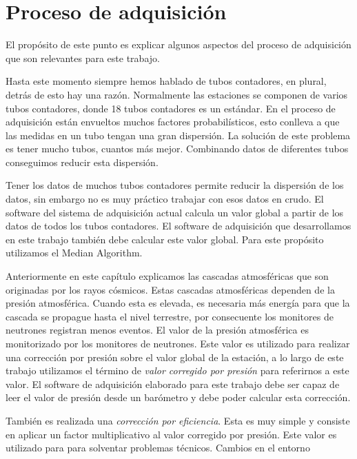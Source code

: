 \section{Proceso de adquisición}
	El propósito de este punto es explicar algunos aspectos del proceso de adquisición que son relevantes para este trabajo.
	\begin{description}[leftmargin=0cm]
		\item[Múltiples Tubos]
			Hasta este momento siempre hemos hablado de tubos contadores, en plural, detrás de esto hay una razón. Normalmente las
			estaciones se componen de varios tubos contadores, donde 18 tubos contadores es un estándar. En el proceso de adquisición
			están envueltos muchos factores probabilísticos, esto conlleva a que las medidas en un tubo tengan una gran dispersión. La
			solución de este problema es tener mucho tubos, cuantos más mejor. Combinando datos de diferentes tubos conseguimos reducir
			esta dispersión. 
		\item[Valor global]
		  	Tener los datos de muchos tubos contadores permite reducir la dispersión de los datos, sin embargo no es muy práctico trabajar
			con esos datos en crudo. El software del sistema de adquisición actual calcula un valor global a partir de los datos de todos
			los tubos contadores. El software de adquisición que desarrollamos en este trabajo también debe calcular este valor global.
			Para este propósito utilizamos el Median Algorithm\cite{MedianAlgr}.
		\item[Correcciónes]
			Anteriormente en este capítulo explicamos las cascadas atmosféricas que son originadas por los rayos cósmicos. Estas cascadas
			atmosféricas dependen de la presión atmosférica. Cuando esta es elevada, es necesaria más energía para que la cascada se
			propague hasta el nivel terrestre, por consecuente los monitores de neutrones registran menos eventos. El valor de la presión
			atmosférica es monitorizado por los monitores de neutrones. Este valor es utilizado para realizar una corrección por presión
			sobre el valor global de la estación, a lo largo de este trabajo utilizamos el término de \emph{valor corregido por presión}
			para referirnos a este valor. El software de adquisición elaborado para este trabajo debe ser capaz de leer el valor de
			presión desde un barómetro y debe poder calcular esta corrección. 
			\par
			También es realizada una \emph{corrección por eficiencia}. Esta es muy simple y consiste en aplicar un factor multiplicativo
			al valor corregido por presión. Este valor es utilizado para para solventar problemas técnicos. Cambios en el entorno

\end{description}
